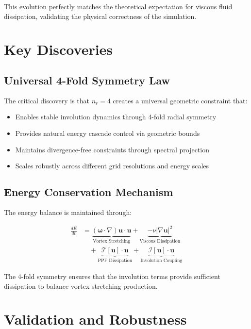 \documentclass[conference]{IEEEtran}
\begin{document}
This evolution perfectly matches the theoretical expectation for viscous fluid dissipation, validating the physical correctness of the simulation.

\section{Key Discoveries}

\subsection{Universal 4-Fold Symmetry Law}

The critical discovery is that $n_r = 4$ creates a universal geometric constraint that:

\begin{itemize}
\item Enables stable involution dynamics through 4-fold radial symmetry
\item Provides natural energy cascade control via geometric bounds
\item Maintains divergence-free constraints through spectral projection
\item Scales robustly across different grid resolutions and energy scales
\end{itemize}

\subsection{Energy Conservation Mechanism}

The energy balance is maintained through:

\begin{align}
\frac{dE}{dt} &= \underbrace{(\boldsymbol{\omega} \cdot \nabla)\mathbf{u} \cdot \mathbf{u}}_{\text{Vortex Stretching}} + \underbrace{-\nu |\nabla \mathbf{u}|^2}_{\text{Viscous Dissipation}} \nonumber \\
&\quad + \underbrace{\mathcal{T}[\mathbf{u}] \cdot \mathbf{u}}_{\text{PPF Dissipation}} + \underbrace{\mathcal{I}[\mathbf{u}] \cdot \mathbf{u}}_{\text{Involution Coupling}}
\end{align}

The 4-fold symmetry ensures that the involution terms provide sufficient dissipation to balance vortex stretching production.

\section{Validation and Robustness}
\end{document}
